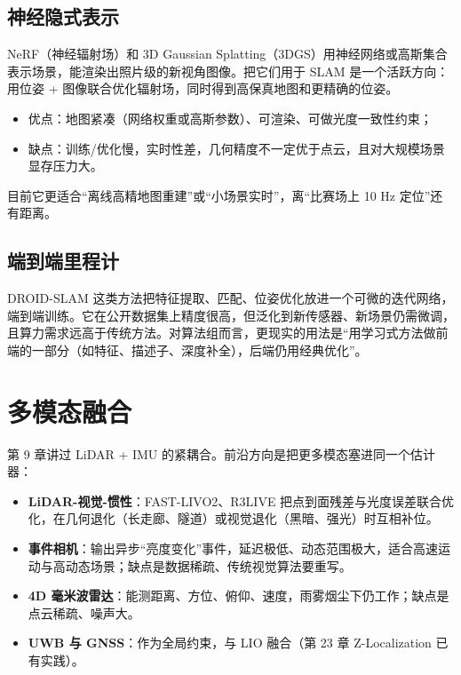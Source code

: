 \subsection{神经隐式表示}

NeRF（神经辐射场）和 3D Gaussian Splatting（3DGS）用神经网络或高斯集合表示场景，能渲染出照片级的新视角图像。把它们用于 SLAM 是一个活跃方向：用位姿 + 图像联合优化辐射场，同时得到高保真地图和更精确的位姿。
\begin{itemize}
  \item 优点：地图紧凑（网络权重或高斯参数）、可渲染、可做光度一致性约束；
  \item 缺点：训练/优化慢，实时性差，几何精度不一定优于点云，且对大规模场景显存压力大。
\end{itemize}
目前它更适合“离线高精地图重建”或“小场景实时”，离“比赛场上 10 Hz 定位”还有距离。

\subsection{端到端里程计}

DROID-SLAM 这类方法把特征提取、匹配、位姿优化放进一个可微的迭代网络，端到端训练。它在公开数据集上精度很高，但泛化到新传感器、新场景仍需微调，且算力需求远高于传统方法。对算法组而言，更现实的用法是“用学习式方法做前端的一部分（如特征、描述子、深度补全），后端仍用经典优化”。

\section{多模态融合}\label{sec:24-multimodal}

第 9 章讲过 LiDAR + IMU 的紧耦合。前沿方向是把更多模态塞进同一个估计器：
\begin{itemize}
  \item \textbf{LiDAR-视觉-惯性}：FAST-LIVO2\cite{yuan2024fastlivo2}、R3LIVE\cite{lin2022r3live} 把点到面残差与光度误差联合优化，在几何退化（长走廊、隧道）或视觉退化（黑暗、强光）时互相补位。
  \item \textbf{事件相机}：输出异步“亮度变化”事件，延迟极低、动态范围极大，适合高速运动与高动态场景；缺点是数据稀疏、传统视觉算法要重写。
  \item \textbf{4D 毫米波雷达}：能测距离、方位、俯仰、速度，雨雾烟尘下仍工作；缺点是点云稀疏、噪声大。
  \item \textbf{UWB 与 GNSS}：作为全局约束，与 LIO 融合（第 23 章 Z-Localization 已有实践）。
\end{itemize}

